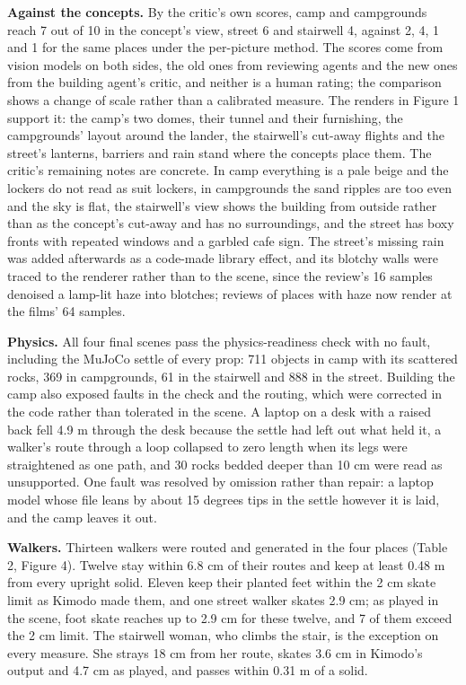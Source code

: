 \textbf{Against the concepts.} By the critic's own scores, camp and campgrounds reach 7 out of 10 in the concept's view, street 6 and stairwell 4, against 2, 4, 1 and 1 for the same places under the per-picture method. The scores come from vision models on both sides, the old ones from reviewing agents and the new ones from the building agent's critic, and neither is a human rating; the comparison shows a change of scale rather than a calibrated measure. The renders in Figure 1 support it: the camp's two domes, their tunnel and their furnishing, the campgrounds' layout around the lander, the stairwell's cut-away flights and the street's lanterns, barriers and rain stand where the concepts place them. The critic's remaining notes are concrete. In camp everything is a pale beige and the lockers do not read as suit lockers, in campgrounds the sand ripples are too even and the sky is flat, the stairwell's view shows the building from outside rather than as the concept's cut-away and has no surroundings, and the street has boxy fronts with repeated windows and a garbled cafe sign. The street's missing rain was added afterwards as a code-made library effect, and its blotchy walls were traced to the renderer rather than to the scene, since the review's 16 samples denoised a lamp-lit haze into blotches; reviews of places with haze now render at the films' 64 samples.

\textbf{Physics.} All four final scenes pass the physics-readiness check with no fault, including the MuJoCo settle of every prop: 711 objects in camp with its scattered rocks, 369 in campgrounds, 61 in the stairwell and 888 in the street. Building the camp also exposed faults in the check and the routing, which were corrected in the code rather than tolerated in the scene. A laptop on a desk with a raised back fell 4.9 m through the desk because the settle had left out what held it, a walker's route through a loop collapsed to zero length when its legs were straightened as one path, and 30 rocks bedded deeper than 10 cm were read as unsupported. One fault was resolved by omission rather than repair: a laptop model whose file leans by about 15 degrees tips in the settle however it is laid, and the camp leaves it out.

\textbf{Walkers.} Thirteen walkers were routed and generated in the four places (Table 2, Figure 4). Twelve stay within 6.8 cm of their routes and keep at least 0.48 m from every upright solid. Eleven keep their planted feet within the 2 cm skate limit as Kimodo made them, and one street walker skates 2.9 cm; as played in the scene, foot skate reaches up to 2.9 cm for these twelve, and 7 of them exceed the 2 cm limit. The stairwell woman, who climbs the stair, is the exception on every measure. She strays 18 cm from her route, skates 3.6 cm in Kimodo's output and 4.7 cm as played, and passes within 0.31 m of a solid.

